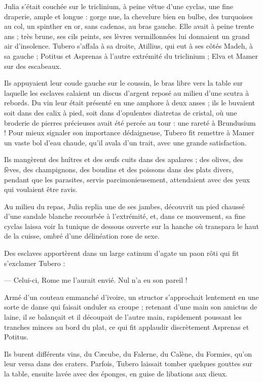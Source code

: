 \documentclass[a4paper, 11pt, oneside, polutonikogreek, french]{article}
\begin{document}
Julia s'était couchée sur le triclinium, à peine vêtue d'une cyclas, une fine draperie, ample et longue : gorge nue, la chevelure bien en bulbe, des turquoises au col, un spinther en or, sans cadenas, au bras gauche. Elle avait à peine trente ans ; très brune, ses cils peints, ses lèvres vermillonnées lui donnaient un grand air d'insolence. Tubero s'affala à sa droite, Atillius, qui eut à ses côtés Madeh, à sa gauche ; Potitus et Asprenas à l'autre extrémité du triclinium ; Elva et Mamer sur des escabeaux.

Ils appuyaient leur coude gauche sur le coussin, le bras libre vers la table sur laquelle les esclaves calaient un discus d'argent reposé au milieu d'une scutra à rebords. Du vin leur était présenté en une amphore à deux anses ; ils le buvaient soit dans des calix à pied, soit dans d'opulentes diatretas de cristal, où une broderie de pierres précieuses avait été percée au tour : une rareté à Brundusium ! Pour mieux signaler son importance dédaigneuse, Tubero fit remettre à Mamer un vaste bol d'eau chaude, qu'il avala d'un trait, avec une grande satisfaction.

Ils mangèrent des huîtres et des œufs cuits dans des apalares ; des olives, des fèves, des champignons, des boudins et des poissons dans des plats divers, pendant que les parasites, servis parcimonieusement, attendaient avec des yeux qui voulaient être ravis.

Au milieu du repas, Julia replia une de ses jambes, découvrit un pied chaussé d'une sandale blanche recourbée à l'extrémité, et, dans ce mouvement, sa fine cyclas laissa voir la tunique de dessous ouverte sur la hanche où transpara le haut de la cuisse, ombré d'une délinéation rose de sexe.

Des esclaves apportèrent dans un large catinum d'agate un paon rôti qui fit s'exclamer Tubero :

--- Celui-ci, Rome me l'aurait envié. Nul n'a eu son pareil !

Armé d'un couteau emmanché d'ivoire, un structor s'approchait lentement en une sorte de danse qui faisait onduler sa croupe ; retenant d'une main son amictus de laine, il se balançait et il découpait de l'autre main, rapidement poussant les tranches minces au bord du plat, ce qui fit applaudir discrètement Asprenas et Potitus.

Ils burent différents vins, du Cæcube, du Falerne, du Calène, du Formies, qu'on leur versa dans des craters. Parfois, Tubero laissait tomber quelques gouttes sur la table, ensuite lavée avec des éponges, en guise de libations aux dieux.
\end{document}
